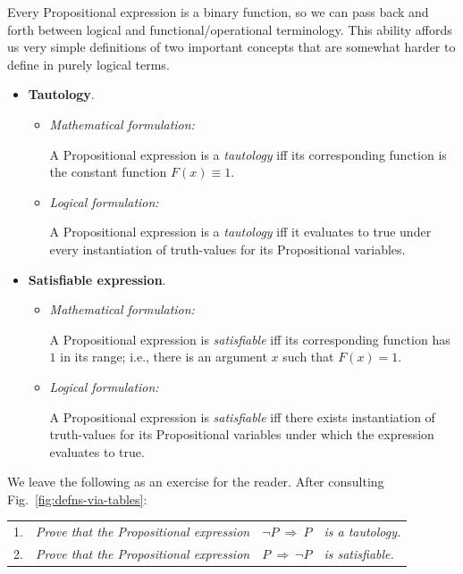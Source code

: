 \medskip

Every Propositional expression is a binary function, so we can pass
back and forth between logical and functional/operational
terminology.  This ability affords us very simple definitions of two
important concepts that are somewhat harder to define in purely logical
terms.
\begin{itemize}
\item
{\bf Tautology}. 
  \begin{itemize}
  \item
{\it Mathematical formulation:}
  
A Propositional expression is a {\it tautology} iff its corresponding
function is the constant function $F(x) \equiv 1$.
  \item
{\it Logical formulation:}
  
A Propositional expression is a {\it tautology} iff it evaluates to
{\sc true} under every instantiation of truth-values for its
Propositional variables.
  \end{itemize}
\item
{\bf Satisfiable expression}. 
  \begin{itemize}
  \item
{\it Mathematical formulation:}

A Propositional expression is {\it satisfiable} iff its corresponding
function has $1$ in its range; i.e., there is an argument $x$ such
that $F(x) = 1$.
  \item
{\it Logical formulation:}

A Propositional expression is {\it satisfiable} iff there exists
instantiation of truth-values for its Propositional variables under
which the expression evaluates to {\sc true}.
  \end{itemize}
\end{itemize}

\noindent
We leave the following as an exercise for the reader.  After
consulting Fig.~\ref{fig:defns-via-tables}:

\begin{tabular}{llcl}
1. &
{\it Prove that the Propositional expression} &
$\neg P \ \Rightarrow \ P$ &
{\it is a tautology.} \\
2. &
{\it Prove that the Propositional expression} &
$P \ \Rightarrow \ \neg P$ &
{\it is satisfiable.}
\end{tabular}

